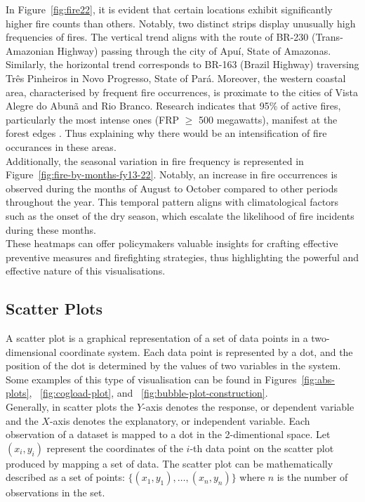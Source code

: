 \documentclass{article}\usepackage[]{graphicx}\usepackage[]{xcolor}
\numberwithin{equation}{section}
\begin{document}
\noindent
In Figure~\ref{fig:fire22}, it is evident that certain locations exhibit significantly higher fire counts than others. Notably, two distinct strips display unusually high frequencies of fires. The vertical trend aligns with the route of BR-230 (Trans-Amazonian Highway) passing through the city of Apuí, State of Amazonas. Similarly, the horizontal trend corresponds to BR-163 (Brazil Highway) traversing Três Pinheiros in Novo Progresso, State of Pará. Moreover, the western coastal area, characterised by frequent fire occurrences, is proximate to the cities of Vista Alegre do Abunã and Rio Branco. Research indicates that 95\% of active fires, particularly the most intense ones (FRP $\geq$ 500 megawatts), manifest at the forest edges \cite{forest}. Thus explaining why there would be an intensification of fire occurances in these areas.\\ 

\noindent
Additionally, the seasonal variation in fire frequency is represented in Figure~\ref{fig:fire-by-months-fy13-22}. Notably, an increase in fire occurrences is observed during the months of August to October compared to other periods throughout the year. This temporal pattern aligns with climatological factors such as the onset of the dry season, which escalate the likelihood of fire incidents during these months.\\

\noindent 
These heatmaps can offer policymakers valuable insights for crafting effective preventive measures and firefighting strategies, thus highlighting the powerful and effective nature of this visualisations.

\subsection{Scatter Plots}

A scatter plot is a graphical representation of a set of data points in a two-dimensional coordinate system. Each data point is represented by a dot, and the position of the dot is determined by the values of two variables in the system. Some examples of this type of visualisation can be found in Figures~\ref{fig:abs-plots}, ~\ref{fig:cogload-plot}, and ~\ref{fig:bubble-plot-construction}.\\

\noindent
Generally, in scatter plots the \(Y\)-axis denotes the response, or dependent variable and the \(X\)-axis denotes the explanatory, or independent variable. Each observation of a dataset is mapped to a dot in the 2-dimentional space. Let \((x_i, y_i)\) represent the coordinates of the \(i\)-th data point on the scatter plot produced by mapping a set of data. The scatter plot can be mathematically described as a set of points: \( \{(x_1, y_1), \ldots, (x_n, y_n)\}\) where \(n\) is the number of observations in the set.
\end{document}
